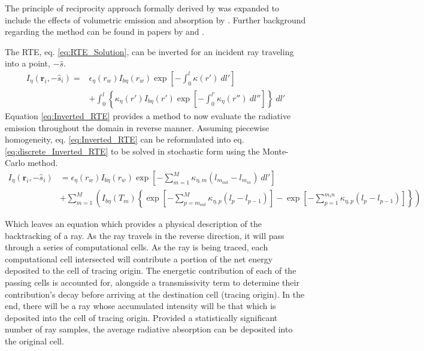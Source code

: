 The principle of reciprocity approach formally derived by \citet{Case1957TransferPrinciple} was expanded to include the effects of volumetric emission and absorption by \citet{Walters1992RigorousMedia}.
Further background regarding the method can be found in papers by \citet{Modest2003BackwardTransfer} and \citet{Howell2010ThermalTransfer}.

The RTE, eq. \ref{eq:RTE_Solution}, can be inverted for an incident ray traveling into a point, $-\hat{s}$.
\begin{equation}
    \begin{aligned}
    I_\eta{}(\textbf{r}_i,-\hat{s}_i) = &\epsilon{}_\eta{}(r_w)I_{b\eta{}}(r_w)\exp{\left[-\int_0^l\kappa{}(r')~dl'\right]}\\
    &+\int_{0}^{l}{ \left\{ \kappa_\eta(r')I_{b\eta}(r')\exp{\left[-\int_0^{l'}\kappa_\eta(r'')~dl''\right]} \right\}}~dl'
    \label{eq:Inverted_RTE}
    \end{aligned}
\end{equation}
Equation \ref{eq:Inverted_RTE} provides a method to now evaluate the radiative emission throughout the domain in reverse manner.
Assuming piecewise homogeneity, eq. \ref{eq:Inverted_RTE} can be reformulated into eq. \ref{eq:discrete_Inverted_RTE} to be solved in stochastic form using the Monte-Carlo method.
\begin{equation}
    \begin{aligned}
    I_\eta{}(\textbf{r}_i,-\hat{s}_i)& = \epsilon{}_\eta{}(r_w)I_{b\eta{}}(r_w)\exp{\left[-\sum_{m=1}^M\kappa{}_{\eta{},m}(l_{m_{out}}-l_{m_{in}})~dl'\right]}\\
    &+\sum_{m=1}^M\left( I_{b\eta}(T_m)\left\{ \exp{\left[-\sum_{p=m_{out}}^M\kappa{}_{\eta{},p}(l_{p}-l_{p-1})\right]}- \exp{\left[-\sum_{p=1}^{m_in}\kappa{}_{\eta{},p}(l_{p}-l_{p-1})\right]} \right\} \right)
    \label{eq:discrete_Inverted_RTE}
    \end{aligned}
\end{equation}

Which leaves an equation which provides a physical description of the backtracking of a ray.
As the ray travels in the reverse direction, it will pass through a series of computational cells. 
As the ray is being traced, each computational cell intersected will contribute a portion of the net energy deposited to the cell of tracing origin. The energetic contribution of each of the passing cells is accounted for, alongside a transmissivity term to determine their contribution's decay before arriving at the destination cell (tracing origin).
In the end, there will be a ray whose accumulated intensity will be that which is deposited into the cell of tracing origin.
Provided a statistically significant number of ray samples, the average radiative absorption can be deposited into the original cell.


